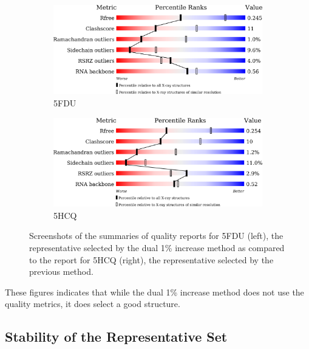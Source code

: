 \begin{figure}
  \begin{subfigure}[b]{0.5\textwidth}
    \includegraphics[width=\linewidth]{chapter-4/figs/quality-reports/5FDU}
    \caption{5FDU}
    \label{fig:5FDU-quality}
  \end{subfigure}
  \begin{subfigure}[b]{0.5\textwidth}
    \includegraphics[width=\linewidth]{chapter-4/figs/quality-reports/5HCQ}
    \caption{5HCQ}
    \label{fig:5HCQ-quality}
  \end{subfigure}
  \caption{Screenshots of the summaries of quality reports for 5FDU (left), the
          representative selected by the dual 1\% increase method as compared to
          the report for 5HCQ (right), the representative selected by the previous
          method.}
  \label{fig:tt-lsu-report}
\end{figure}

These figures indicates that while the dual 1\% increase method does not use the
quality metrics, it does select a good structure.

\subsection{Stability of the Representative Set}

